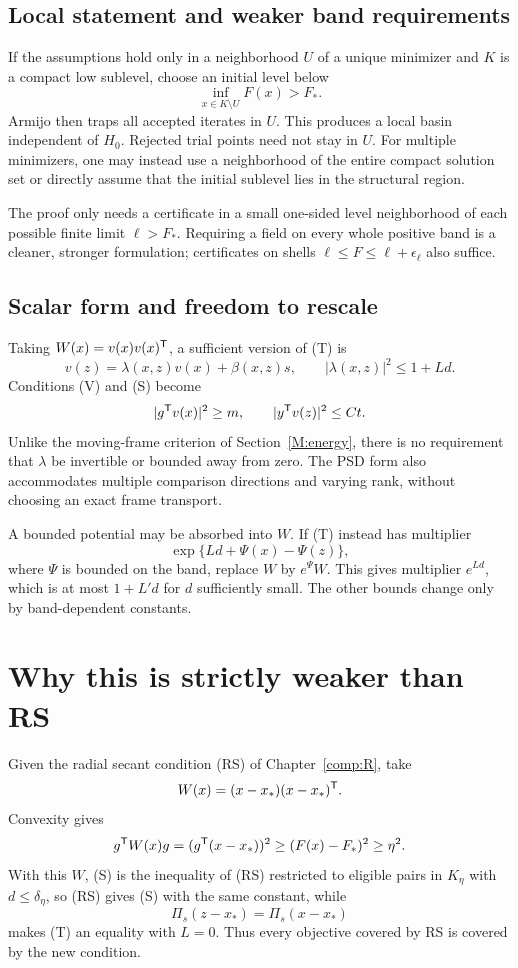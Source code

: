 

\subsection{Local statement and weaker band requirements}
If the assumptions hold only in a neighborhood $U$ of a unique minimizer and $K$ is a compact low sublevel, choose an initial level below
\[
 \inf_{x\in K\setminus U}F(x)>F_*.
\]
Armijo then traps all accepted iterates in $U$. This produces a local basin independent of $H_0$. Rejected trial points need not stay in $U$. For multiple minimizers, one may instead use a neighborhood of the entire compact solution set or directly assume that the initial sublevel lies in the structural region.

The proof only needs a certificate in a small one-sided level neighborhood of each possible finite limit $\ell>F_*$. Requiring a field on every whole positive band is a cleaner, stronger formulation; certificates on shells $\ell\le F\le\ell+\epsilon_\ell$ also suffice.



\subsection{Scalar form and freedom to rescale}
Taking $W(x)=v(x)v(x)^{\mathsf T}$, a sufficient version of (T) is
\[
 v(z)=\lambda(x,z)v(x)+\beta(x,z)s,\qquad
 |\lambda(x,z)|^2\le1+L d.
\]
Conditions (V) and (S) become
\[
 |g^{\mathsf T} v(x)|^2\ge m,\qquad |y^{\mathsf T} v(z)|^2\le Ct.
\]
Unlike the moving-frame criterion of Section~\ref{M:energy}, there is no requirement that $\lambda$ be invertible or bounded away from zero. The PSD form also accommodates multiple comparison directions and varying rank, without choosing an exact frame transport.

A bounded potential may be absorbed into $W$. If (T) instead has multiplier
\[
 \exp\{L d+\Psi(x)-\Psi(z)\},
\]
where $\Psi$ is bounded on the band, replace $W$ by $e^{\Psi}W$. This gives multiplier $e^{Ld}$, which is at most $1+L'd$ for $d$ sufficiently small. The other bounds change only by band-dependent constants.


\setcounter{section}{3}
\setcounter{theorem}{1}
\setcounter{lemma}{0}
\setcounter{corollary}{0}
\setcounter{proposition}{0}
\setcounter{remark}{0}
\setcounter{equation}{6}


\section{Why this is strictly weaker than RS}
Given the radial secant condition (RS) of Chapter~\ref{comp:R}, take
\[
 W(x)=(x-x_*)(x-x_*)^{\mathsf T}.
\]
Convexity gives
\[
 g^{\mathsf T} W(x)g=(g^{\mathsf T}(x-x_*))^2\ge(F(x)-F_*)^2\ge\eta^2.
\]
With this $W$, (S) is the inequality of (RS) restricted to eligible pairs in $K_\eta$ with $d\le\delta_\eta$, so (RS) gives (S) with the same constant, while
\[
 \Pi_s(z-x_*)=\Pi_s(x-x_*)
\]
makes (T) an equality with $L=0$. Thus every objective covered by RS is covered by the new condition.

